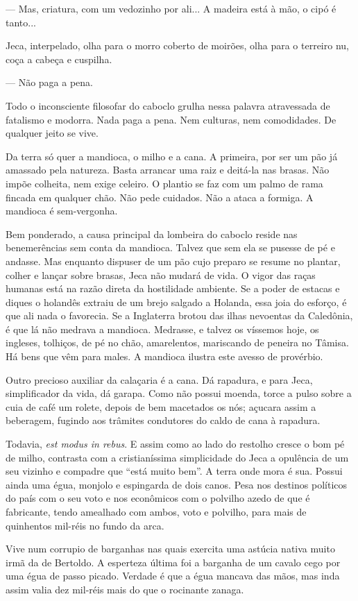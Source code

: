 --- Mas, criatura, com um vedozinho por ali... A madeira está à mão, o
cipó é tanto...

Jeca, interpelado, olha para o morro coberto de moirões, olha para o
terreiro nu, coça a cabeça e cuspilha.

--- Não paga a pena.

Todo o inconsciente filosofar do caboclo grulha nessa palavra
atravessada de fatalismo e modorra. Nada paga a pena. Nem culturas, nem
comodidades. De qualquer jeito se vive.

Da terra só quer a mandioca, o milho e a cana. A primeira, por ser um
pão já amassado pela natureza. Basta arrancar uma raiz e deitá-la nas
brasas. Não impõe colheita, nem exige celeiro. O plantio se faz com um
palmo de rama fincada em qualquer chão. Não pede cuidados. Não a ataca a
formiga. A mandioca é sem-vergonha.

Bem ponderado, a causa principal da lombeira do caboclo reside nas
benemerências sem conta da mandioca. Talvez que sem ela se pusesse de pé
e andasse. Mas enquanto dispuser de um pão cujo preparo se resume no
plantar, colher e lançar sobre brasas, Jeca não mudará de vida. O vigor
das raças humanas está na razão direta da hostilidade ambiente. Se a
poder de estacas e diques o holandês extraiu de um brejo salgado a
Holanda, essa joia do esforço, é que ali nada o favorecia. Se a
Inglaterra brotou das ilhas nevoentas da Caledônia, é que lá não medrava
a mandioca. Medrasse, e talvez os víssemos hoje, os ingleses, tolhiços,
de pé no chão, amarelentos, mariscando de peneira no Tâmisa. Há bens que
vêm para males. A mandioca ilustra este avesso de provérbio.

Outro precioso auxiliar da calaçaria é a cana. Dá rapadura, e para Jeca,
simplificador da vida, dá garapa. Como não possui moenda, torce a pulso
sobre a cuia de café um rolete, depois de bem macetados os nós; açucara
assim a beberagem, fugindo aos trâmites condutores do caldo de cana à
rapadura.

Todavia, \emph{est modus in rebus}. E assim como ao lado do restolho
cresce o bom pé de milho, contrasta com a cristianíssima simplicidade do
Jeca a opulência de um seu vizinho e compadre que ``está muito bem''. A
terra onde mora é sua. Possui ainda uma égua, monjolo e espingarda de
dois canos. Pesa nos destinos políticos do país com o seu voto e nos
econômicos com o polvilho azedo de que é fabricante, tendo amealhado com
ambos, voto e polvilho, para mais de quinhentos mil-réis no fundo da
arca.

Vive num corrupio de barganhas nas quais exercita uma astúcia nativa
muito irmã da de Bertoldo. A esperteza última foi a barganha de um
cavalo cego por uma égua de passo picado. Verdade é que a égua mancava
das mãos, mas inda assim valia dez mil-réis mais do que o rocinante
zanaga.

